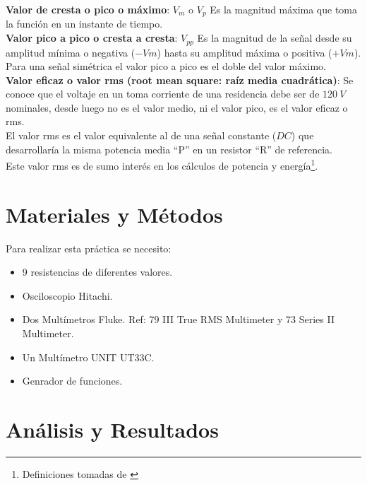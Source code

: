 \documentclass[twocolumn]{IEEEtran}
\begin{document}
\noindent
\textbf{Valor de cresta o pico o máximo}: $V_m$ o $V_p$ Es la magnitud máxima
que toma la función en un instante de tiempo.\\
\textbf{Valor pico a pico o cresta a cresta}: $V_{pp}$ Es la magnitud de la
señal desde su amplitud mínima o negativa ($-Vm$) hasta su amplitud máxima o
positiva ($+Vm$). Para una señal simétrica el valor pico a pico es el doble del
valor máximo.\\
\textbf{Valor eficaz o valor rms (root mean square: raíz media cuadrática)}: Se
conoce que el voltaje en un toma corriente de una residencia debe ser de $120 \
V$ nominales, desde luego no es el valor medio, ni el valor pico, es el valor
eficaz o rms.\\
El valor rms es el valor equivalente al de una señal constante ($DC$) que
desarrollaría la misma potencia media ``P'' en un resistor ``R'' de
referencia.\\
Este valor rms es de sumo interés en los cálculos de potencia y
energía\footnote{Definiciones tomadas de \cite{page1}}.

\section{Materiales y Métodos}
\noindent
Para realizar esta práctica se necesito:
\begin{itemize}
  \item 9 resistencias de diferentes valores.
  \item Osciloscopio Hitachi.
  \item Dos Multímetros Fluke. Ref: 79 III True RMS Multimeter y 73 Series II
Multimeter.
  \item Un Multímetro UNIT UT33C.
  \item Genrador de funciones.
\end{itemize}

\section{Análisis y Resultados}
\noindent
\end{document}
